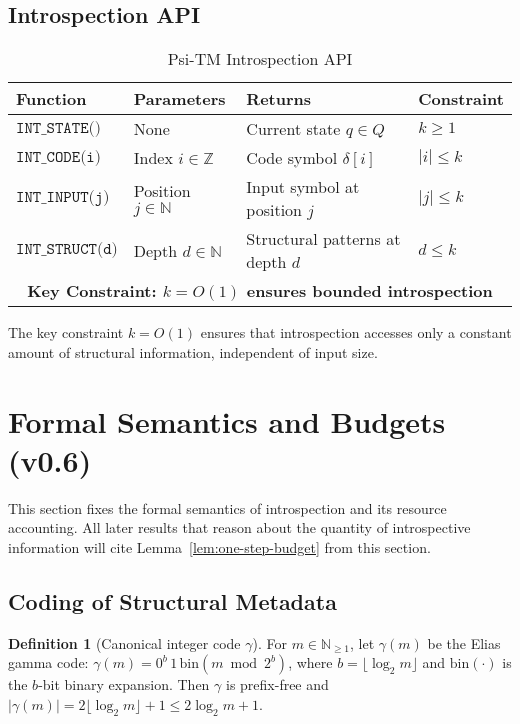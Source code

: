 \documentclass[11pt]{article}
\theoremstyle{definition}
\newtheorem{definition}[theorem]{Definition}
\begin{document}
\subsection{Introspection API}

\begin{table}[ht]
\centering
\caption{Psi-TM Introspection API}
\label{tab:introspection-api}
\begin{tabular}{|l|l|l|l|}
\hline
\textbf{Function} & \textbf{Parameters} & \textbf{Returns} & \textbf{Constraint} \\
\hline
$\texttt{INT\_STATE()}$ & None & Current state $q \in Q$ & $k \geq 1$ \\
\hline
$\texttt{INT\_CODE(i)}$ & Index $i \in \mathbb{Z}$ & Code symbol $\delta[i]$ & $|i| \leq k$ \\
\hline
$\texttt{INT\_INPUT(j)}$ & Position $j \in \mathbb{N}$ & Input symbol at position $j$ & $|j| \leq k$ \\
\hline
$\texttt{INT\_STRUCT(d)}$ & Depth $d \in \mathbb{N}$ & Structural patterns at depth $d$ & $d \leq k$ \\
\hline
\multicolumn{4}{|c|}{\textbf{Key Constraint: $k = O(1)$ ensures bounded introspection}} \\
\hline
\end{tabular}
\end{table}

The key constraint $k = O(1)$ ensures that introspection accesses only a constant amount of structural information, independent of input size.

\section{Formal Semantics and Budgets (v0.6)}

This section fixes the formal semantics of introspection and its resource accounting. All later results that reason about the quantity of introspective information will cite Lemma~\ref{lem:one-step-budget} from this section.

\subsection{Coding of Structural Metadata}

\begin{definition}[Canonical integer code $\gamma$]
\label{def:gamma}
For $m\in\mathbb{N}_{\ge1}$, let $\gamma(m)$ be the Elias gamma code: $\gamma(m)=0^{b}\,1\,\mathrm{bin}(m\bmod 2^{b})$, where $b=\lfloor\log_2 m\rfloor$ and $\mathrm{bin}(\cdot)$ is the $b$-bit binary expansion. Then $\gamma$ is prefix-free and $|\gamma(m)|=2\lfloor\log_2 m\rfloor+1\le 2\log_2 m + 1$.
\end{definition}
\end{document}
